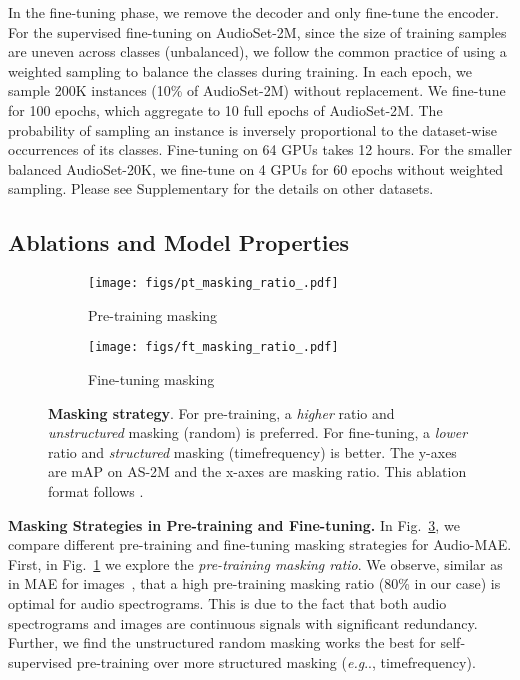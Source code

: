 \documentclass{article}
\makeatletter
\DeclareRobustCommand\onedot{\futurelet\@let@token\@onedot}
\def\@onedot{\ifx\@let@token.\else.\null\fi\xspace}
\def\eg{\emph{e.g}\onedot} \def\Eg{\emph{E.g}\onedot}
\renewcommand{\paragraph}[1]{\vspace{1.25mm}\noindent\textbf{#1}}
\makeatother
\begin{document}
In the fine-tuning phase, we remove the decoder and only fine-tune the encoder.
For the supervised fine-tuning on AudioSet-2M, since the size of training samples are uneven across classes (unbalanced), we follow the common practice of using a weighted sampling to balance the classes during training. 
In each epoch, we sample 200K instances (10\% of AudioSet-2M) without replacement. We  fine-tune for 100 epochs, which aggregate to 10 full epochs of AudioSet-2M.
The probability of sampling an instance is inversely proportional to the dataset-wise occurrences of its classes. 
Fine-tuning on 64 GPUs takes 12 hours.
For the smaller balanced AudioSet-20K, we fine-tune on 4 GPUs for 60 epochs without weighted sampling.
Please see Supplementary for the details on other datasets.







\subsection{Ablations and Model Properties \label{sec:ablations}}



\begin{figure}[t]
\centering
    \begin{subfigure}[b]{0.48\linewidth}
        \texttt{[image: figs/pt\_masking\_ratio\_.pdf]}
\caption{Pre-training masking}
\label{fig:pt_masking_comparison}
    \end{subfigure}
    \begin{subfigure}[b]{0.48\linewidth}
        \texttt{[image: figs/ft\_masking\_ratio\_.pdf]}
\caption{Fine-tuning masking}
\label{fig:ft_masking_comparison}
    \end{subfigure}
\caption{\textbf{Masking strategy}. 
For pre-training, a \textit{higher} ratio and \textit{unstructured} masking (random) is preferred.
    For fine-tuning, a \textit{lower} ratio and \textit{structured} masking (timefrequency) is better. 
    The y-axes are mAP on AS-2M and the x-axes are masking ratio. This ablation format follows \cite{mae}. 
    }
    \label{fig:masking_comparison}
    \vspace{-1.0em}
\end{figure}

\paragraph{Masking Strategies in Pre-training and Fine-tuning.}
In Fig.~\ref{fig:masking_comparison}, we compare different pre-training and fine-tuning masking strategies for Audio-MAE.
First, in Fig.~\ref{fig:pt_masking_comparison} we explore the \textit{pre-training masking ratio}. We observe, similar as in MAE for images~\cite{mae}, that a high pre-training masking ratio (80\% in our case) is optimal for audio spectrograms. 
This is due to the fact that both audio spectrograms and images are continuous signals with significant redundancy.
Further, we find the unstructured random masking works the best for self-supervised pre-training over more structured masking (\eg, timefrequency).
\end{document}
